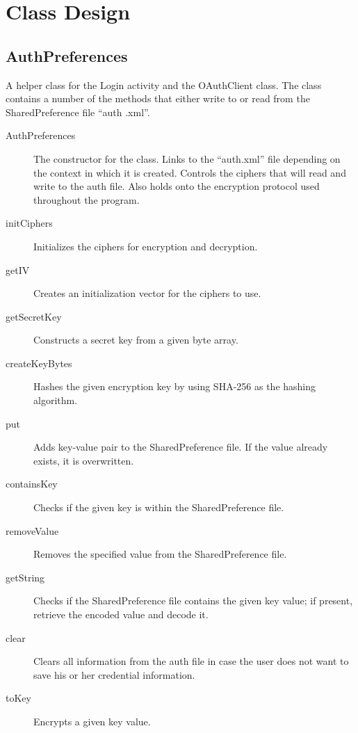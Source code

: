 \documentclass{article}
\begin{document}
\section{Class Design}

\subsection{AuthPreferences}
A helper class for the Login activity and the OAuthClient class. The class contains a 
number of the methods that either write to or read from the SharedPreference file ``auth
.xml''.
\begin{description}
    \item[AuthPreferences]  The constructor for the class. Links to the ``auth.xml'' file 
                            depending on the context in which it is created. Controls the 
                            ciphers that will read and write to the auth file. Also holds 
                            onto the encryption protocol used throughout the program.
    \item[initCiphers]      Initializes the ciphers for encryption and decryption.
    \item[getIV]            Creates an initialization vector for the ciphers to use.
    \item[getSecretKey]     Constructs a secret key from a given byte array.
    \item[createKeyBytes]   Hashes the given encryption key by using SHA-256 as the 
                            hashing algorithm.
    \item[put]              Adds key-value pair to the SharedPreference file. If the value
                            already exists, it is overwritten.
    \item[containsKey]      Checks if the given key is within the SharedPreference file.
    \item[removeValue]      Removes the specified value from the SharedPreference file.
    \item[getString]        Checks if the SharedPreference file contains the given key  
                            value; if present, retrieve the encoded value and decode it.
    \item[clear]            Clears all information from the auth file in case the user 
                            does not want to save his or her credential information.
    \item[toKey]            Encrypts a given key value.

\end{description}
\end{document}
